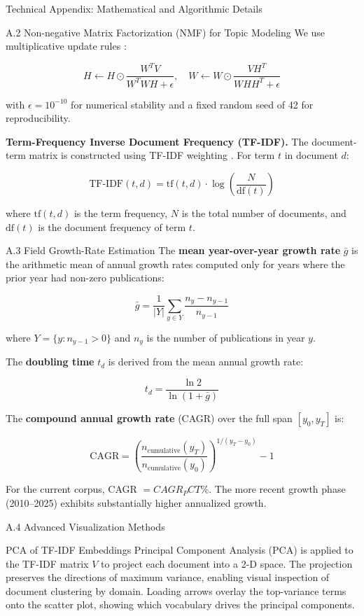 \documentclass[
  ignorenonframetext,
]{beamer}
\begin{document}
\begin{frame}{Technical Appendix: Mathematical and Algorithmic Details
\label{sec:technical_appendix}}
\begin{block}{A.2 Non-negative Matrix Factorization (NMF) for Topic
Modeling}
We use multiplicative update rules \citep{lee1999nmf}:

\[H \leftarrow H \odot \frac{W^T V}{W^T W H + \epsilon}, \quad W \leftarrow W \odot \frac{V H^T}{W H H^T + \epsilon}\]

with \(\epsilon = 10^{-10}\) for numerical stability and a fixed random
seed of 42 for reproducibility.

\textbf{Term-Frequency Inverse Document Frequency (TF-IDF).} The
document-term matrix is constructed using TF-IDF weighting
\citep{salton1975vector}. For term \(t\) in document \(d\):

\[
\text{TF-IDF}(t, d) = \text{tf}(t, d) \cdot \log\!\left(\frac{N}{\text{df}(t)}\right)
\]

where \(\text{tf}(t, d)\) is the term frequency, \(N\) is the total
number of documents, and \(\text{df}(t)\) is the document frequency of
term \(t\).
\end{block}

\begin{block}{A.3 Field Growth-Rate Estimation}
\protect{}\label{a.3-field-growth-rate-estimation}
The \textbf{mean year-over-year growth rate} \(\bar{g}\) is the
arithmetic mean of annual growth rates computed only for years where the
prior year had non-zero publications:

\[
\bar{g} = \frac{1}{|Y|} \sum_{y \in Y} \frac{n_y - n_{y-1}}{n_{y-1}}
\]

where \(Y = \{y : n_{y-1} > 0\}\) and \(n_y\) is the number of
publications in year \(y\).

The \textbf{doubling time} \(t_d\) is derived from the mean annual
growth rate:

\[
t_d = \frac{\ln 2}{\ln(1 + \bar{g})}
\]

The \textbf{compound annual growth rate} (CAGR) over the full span
\([y_0, y_T]\) is:

\[
\text{CAGR} = \left(\frac{n_{\text{cumulative}}(y_T)}{n_{\text{cumulative}}(y_0)}\right)^{1/(y_T - y_0)} - 1
\]

For the current corpus, CAGR \(= {{CAGR_PCT}}\%\). The more recent
growth phase (2010--2025) exhibits substantially higher annualized
growth.
\end{block}

\begin{block}{A.4 Advanced Visualization Methods}
\protect{}\label{a.4-advanced-visualization-methods}
\begin{block}{PCA of TF-IDF Embeddings}
\protect{}\label{pca-of-tf-idf-embeddings}
Principal Component Analysis (PCA) is applied to the TF-IDF matrix \(V\)
to project each document into a 2-D space. The projection preserves the
directions of maximum variance, enabling visual inspection of document
clustering by domain. Loading arrows overlay the top-variance terms onto
the scatter plot, showing which vocabulary drives the principal
components.
\end{block}


\end{block}
\end{frame}
\end{document}
